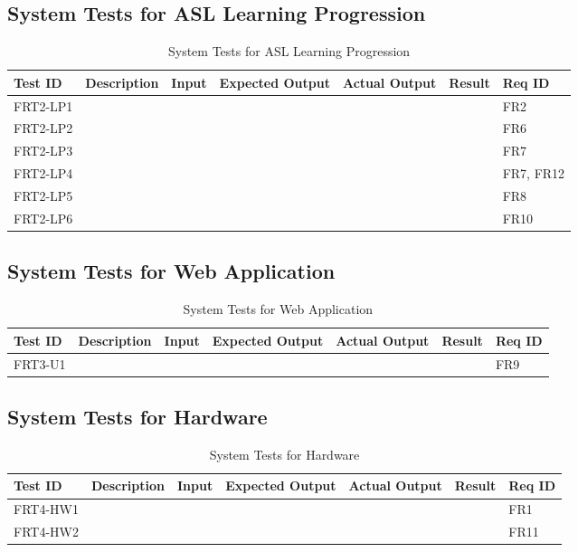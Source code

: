 \documentclass[12pt, titlepage]{article}
\begin{document}
\subsection{System Tests for ASL Learning Progression}
\begin{longtable}{|p{1cm}|p{3cm}|p{2cm}|p{2cm}|p{2cm}|p{2cm}|p{1cm}|}
\caption{System Tests for ASL Learning Progression} \\
\hline
\textbf{Test ID} & \textbf{Description} & \textbf{Input} & \textbf{Expected Output} & \textbf{Actual Output} & \textbf{Result} & \textbf{Req ID}\\
\hline
FRT2-LP1 & & & & & & FR2 \\
\hline
FRT2-LP2 & & & & & & FR6 \\
\hline
FRT2-LP3 & & & & & & FR7 \\
\hline
FRT2-LP4 & & & & & & FR7, FR12 \\
\hline
FRT2-LP5 & & & & & & FR8 \\
\hline
FRT2-LP6 & & & & & & FR10 \\
\bottomrule
\end{longtable}

\subsection{System Tests for Web Application}
\begin{longtable}{|p{1cm}|p{3cm}|p{2cm}|p{2cm}|p{2cm}|p{2cm}|p{1cm}|}
\caption{System Tests for Web Application} \\
\hline
\textbf{Test ID} & \textbf{Description} & \textbf{Input} & \textbf{Expected Output} & \textbf{Actual Output} & \textbf{Result} & \textbf{Req ID}\\
\hline
FRT3-U1 & & & & & & FR9 \\
\bottomrule
\end{longtable}

\subsection{System Tests for Hardware}
\begin{longtable}{|p{1cm}|p{3cm}|p{2cm}|p{2cm}|p{2cm}|p{2cm}|p{1cm}|}
\caption{System Tests for Hardware} \\
\hline
\textbf{Test ID} & \textbf{Description} & \textbf{Input} & \textbf{Expected Output} & \textbf{Actual Output} & \textbf{Result} & \textbf{Req ID}\\
\hline
FRT4-HW1 & & & & & & FR1 \\
\hline
FRT4-HW2 & & & & & & FR11 \\
\bottomrule
\end{longtable}
\end{document}
